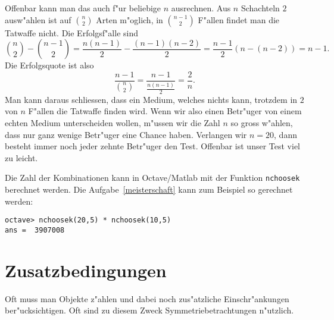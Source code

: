\begin{beispiele}
\begin{loesung}
Offenbar kann man das auch f"ur beliebige $n$ ausrechnen.
Aus $n$
Schachteln $2$ ausw"ahlen ist auf $\binom{n}2$ Arten m"oglich, in
$\binom{n-1}2$ F"allen findet man die Tatwaffe nicht.
Die Erfolgsf"alle
sind
\[
\binom{n}2-\binom{n-1}2
=\frac{n(n-1)}2-\frac{(n-1)(n-2)}2
=\frac{n-1}2(n-(n-2))=n-1.
\]
Die Erfolgsquote ist also
\[
\frac{n-1}{\displaystyle\binom{n}2}=\frac{n-1}{\displaystyle\frac{n(n-1)}2}=\frac2n.
\]
Man kann daraus schliessen, dass ein Medium, welches nichts kann,
trotzdem in $2$ von $n$ F"allen die Tatwaffe finden wird.
Wenn wir also einen Betr"uger von einem echten Medium unterscheiden
wollen, m"ussen wir die Zahl $n$ so gross w"ahlen, dass nur ganz
wenige Betr"uger eine Chance haben.
Verlangen wir $n=20$, dann
besteht immer noch jeder zehnte Betr"uger den Test.
Offenbar ist unser
Test viel zu leicht.
\end{loesung}

\end{beispiele}
Die Zahl der Kombinationen kann in Octave/Matlab mit der Funktion
{\tt nchoosek} berechnet werden.
Die Aufgabe~\ref{meisterschaft}
kann zum Beispiel so gerechnet werden:
\begin{verbatim}
octave> nchoosek(20,5) * nchoosek(10,5)
ans =  3907008
\end{verbatim}

\section{Zusatzbedingungen}
Oft muss man Objekte z"ahlen und dabei noch zus"atzliche Einschr"ankungen
ber"ucksichtigen.
Oft sind zu diesem Zweck Symmetriebetrachtungen
n"utzlich.

